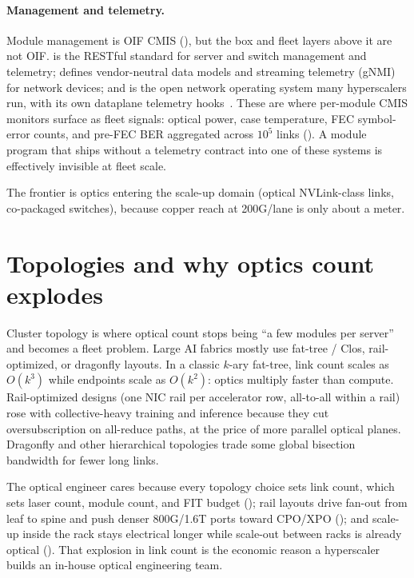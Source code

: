 \paragraph{Management and telemetry.} Module management is OIF CMIS
(), but the box and fleet layers above it are not OIF.
 is the RESTful standard for server and switch management and
telemetry;  defines vendor-neutral data models and streaming
telemetry (gNMI) for network devices; and  is the open network
operating system many hyperscalers run, with its own dataplane telemetry
hooks~. These are where per-module CMIS monitors surface as
fleet signals: optical power, case temperature, FEC symbol-error counts, and
pre-FEC BER aggregated across $10^5$ links ().
A module program that ships without a telemetry contract into one of these systems
is effectively invisible at fleet scale.

The frontier is optics entering the scale-up domain (optical NVLink-class links,
co-packaged switches), because copper reach at 200G/lane is only about a meter.

\section{Topologies and why optics count explodes}
\label{sec:topologies}

Cluster topology is where optical count stops being ``a few modules per server''
and becomes a fleet problem. Large AI fabrics mostly use fat-tree / Clos,
rail-optimized, or dragonfly layouts. In a classic $k$-ary fat-tree, link count
scales as $O(k^3)$ while endpoints scale as $O(k^2)$: optics multiply faster than
compute. Rail-optimized designs (one NIC rail per accelerator row, all-to-all
within a rail) rose with collective-heavy training and inference because they cut
oversubscription on all-reduce paths, at the price of more parallel optical
planes. Dragonfly and other hierarchical topologies trade some global bisection
bandwidth for fewer long links.

The optical engineer cares because every topology choice sets link count, which
sets laser count, module count, and FIT budget (); rail
layouts drive fan-out from leaf to spine and push denser 800G/1.6T ports toward
CPO/XPO (); and scale-up inside the rack stays
electrical longer while scale-out between racks is already optical
(). That explosion in link count is the economic reason a
hyperscaler builds an in-house optical engineering team.

